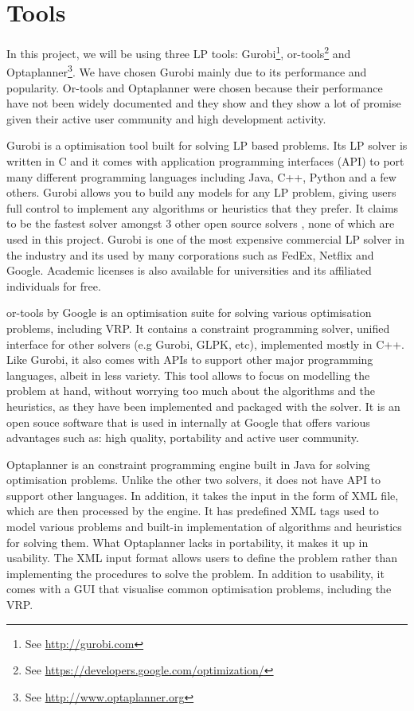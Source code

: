 \section{Tools}
In this project, we will be using three LP tools: Gurobi\footnote{See \url{http://gurobi.com}},
or-tools\footnote{See \url{https://developers.google.com/optimization/}} and Optaplanner\footnote{See \url{http://www.optaplanner.org}}.
We have chosen Gurobi mainly due to its performance and popularity. Or-tools and Optaplanner were chosen because
their performance have not been widely documented and they show and they show a lot of promise given their active user community
and high development activity.

Gurobi is a optimisation tool built for solving LP based problems. Its LP solver is written in C and it comes with
application programming interfaces (API) to port many different programming languages including Java, C++, Python and a few others. Gurobi allows you
to build any models for any LP problem, giving users full control to implement any algorithms or heuristics that they
prefer. It claims to be the fastest solver amongst 3 other open source solvers \cite{gurobi:solvers}, none
of which are used in this project. Gurobi is one of the most expensive commercial LP solver in the industry
and its used by many corporations such as FedEx, Netflix and Google. Academic licenses is also available for universities
and its affiliated individuals for free.

or-tools by Google is an optimisation suite for solving various optimisation problems, including VRP. It contains a constraint programming
solver, unified interface for other solvers (e.g Gurobi, GLPK, etc), implemented mostly in C++. Like Gurobi, it also comes with APIs
to support other major programming languages, albeit in less variety. This tool allows to focus on modelling the problem at hand, without worrying
too much about the algorithms and the heuristics, as they have been implemented and packaged with the solver. It is an open souce
software that is used in internally at Google that offers various advantages such as: high quality, portability and active user community.

Optaplanner is an constraint programming engine built in Java for solving optimisation problems. Unlike the other two solvers, it does not
have API to support other languages. In addition, it takes the input in the form of XML file, which are then processed by the engine. It has
predefined XML tags used to model various problems and built-in implementation of algorithms and heuristics for solving them. What Optaplanner
lacks in portability, it makes it up in usability. The XML input format allows users to define the problem rather than implementing the procedures
to solve the problem. In addition to usability, it comes with a GUI that visualise common optimisation problems, including the VRP.

